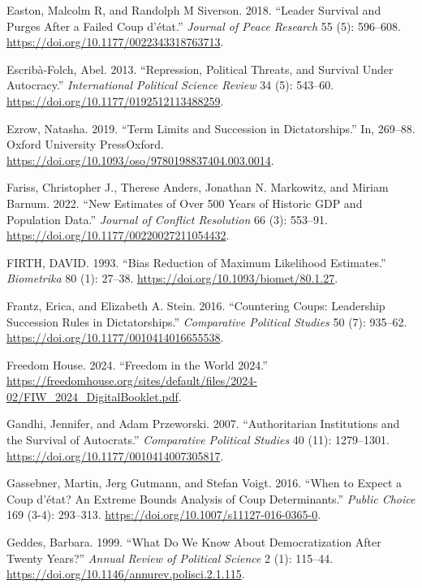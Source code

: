 \documentclass[
  12pt,
]{report}
\newlength{\cslhangindent}
\newenvironment{CSLReferences}[2] %
 {\begin{list}{}{%
  \setlength{\itemindent}{0pt}
  \setlength{\leftmargin}{0pt}
  \setlength{\parsep}{0pt}
  \ifodd #1
   \setlength{\leftmargin}{\cslhangindent}
   \setlength{\itemindent}{-1\cslhangindent}
  \fi
  \setlength{\itemsep}{#2\baselineskip}}}
 {\end{list}}
\begin{document}
\begin{CSLReferences}{1}{0}
Easton, Malcolm R, and Randolph M Siverson. 2018. {``Leader Survival and
Purges After a Failed Coup d{'}état.''} \emph{Journal of Peace Research}
55 (5): 596--608. \url{https://doi.org/10.1177/0022343318763713}.

Escribà-Folch, Abel. 2013. {``Repression, Political Threats, and
Survival Under Autocracy.''} \emph{International Political Science
Review} 34 (5): 543--60. \url{https://doi.org/10.1177/0192512113488259}.

Ezrow, Natasha. 2019. {``Term Limits and Succession in Dictatorships.''}
In, 269--88. Oxford University PressOxford.
\url{https://doi.org/10.1093/oso/9780198837404.003.0014}.

Fariss, Christopher J., Therese Anders, Jonathan N. Markowitz, and
Miriam Barnum. 2022. {``New Estimates of Over 500 Years of Historic GDP
and Population Data.''} \emph{Journal of Conflict Resolution} 66 (3):
553--91. \url{https://doi.org/10.1177/00220027211054432}.

FIRTH, DAVID. 1993. {``Bias Reduction of Maximum Likelihood
Estimates.''} \emph{Biometrika} 80 (1): 27--38.
\url{https://doi.org/10.1093/biomet/80.1.27}.

Frantz, Erica, and Elizabeth A. Stein. 2016. {``Countering Coups:
Leadership Succession Rules in Dictatorships.''} \emph{Comparative
Political Studies} 50 (7): 935--62.
\url{https://doi.org/10.1177/0010414016655538}.

Freedom House. 2024. {``Freedom in the World 2024.''}
\url{https://freedomhouse.org/sites/default/files/2024-02/FIW_2024_DigitalBooklet.pdf}.

Gandhi, Jennifer, and Adam Przeworski. 2007. {``Authoritarian
Institutions and the Survival of Autocrats.''} \emph{Comparative
Political Studies} 40 (11): 1279--1301.
\url{https://doi.org/10.1177/0010414007305817}.

Gassebner, Martin, Jerg Gutmann, and Stefan Voigt. 2016. {``When to
Expect a Coup d{'}état? An Extreme Bounds Analysis of Coup
Determinants.''} \emph{Public Choice} 169 (3-4): 293--313.
\url{https://doi.org/10.1007/s11127-016-0365-0}.

Geddes, Barbara. 1999. {``What Do We Know About Democratization After
Twenty Years?''} \emph{Annual Review of Political Science} 2 (1):
115--44. \url{https://doi.org/10.1146/annurev.polisci.2.1.115}.


\end{CSLReferences}
\end{document}
